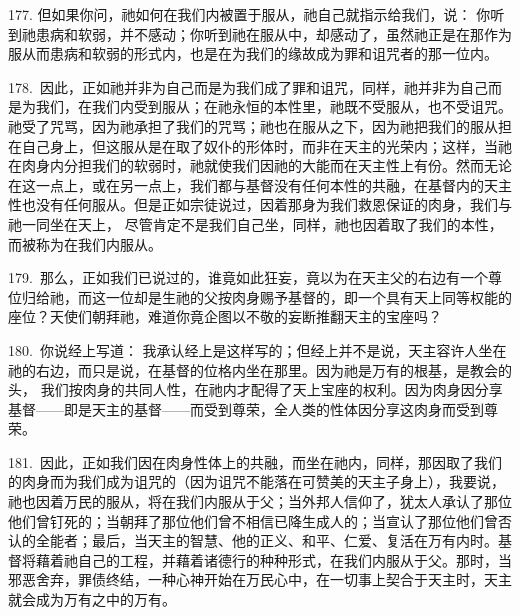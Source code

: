 177. 但如果你问，祂如何在我们内被置于服从，祂自己就指示给我们，说： 你听到祂患病和软弱，并不感动；你听到祂在服从中，却感动了，虽然祂正是在那作为服从而患病和软弱的形式内，也是在为我们的缘故成为罪和诅咒者的那一位内。\par

178.~因此，正如祂并非为自己而是为我们成了罪和诅咒，同样，祂并非为自己而是为我们，在我们内受到服从；在祂永恒的本性里，祂既不受服从，也不受诅咒。 祂受了咒骂，因为祂承担了我们的咒骂；祂也在服从之下，因为祂把我们的服从担在自己身上，但这服从是在取了奴仆的形体时，而非在天主的光荣内；这样，当祂在肉身内分担我们的软弱时，祂就使我们因祂的大能而在天主性上有份。然而无论在这一点上，或在另一点上，我们都与基督没有任何本性的共融，在基督内的天主性也没有任何服从。但是正如宗徒说过，因着那身为我们救恩保证的肉身，我们与祂一同坐在天上， 尽管肯定不是我们自己坐，同样，祂也因着取了我们的本性，而被称为在我们内服从。\par

179.~那么，正如我们已说过的，谁竟如此狂妄，竟以为在天主父的右边有一个尊位归给祂，而这一位却是生祂的父按肉身赐予基督的，即一个具有天上同等权能的座位？天使们朝拜祂，难道你竟企图以不敬的妄断推翻天主的宝座吗？\par

180.~你说经上写道： 我承认经上是这样写的；但经上并不是说，天主容许人坐在祂的右边，而只是说，在基督的位格内坐在那里。因为祂是万有的根基，是教会的头， 我们按肉身的共同人性，在祂内才配得了天上宝座的权利。因为肉身因分享基督——即是天主的基督——而受到尊荣，全人类的性体因分享这肉身而受到尊荣。\par

181.~因此，正如我们因在肉身性体上的共融，而坐在祂内，同样，那因取了我们的肉身而为我们成为诅咒的（因为诅咒不能落在可赞美的天主子身上），我要说，祂也因着万民的服从，将在我们内服从于父；当外邦人信仰了，犹太人承认了那位他们曾钉死的；当朝拜了那位他们曾不相信已降生成人的；当宣认了那位他们曾否认的全能者；最后，当天主的智慧、他的正义、和平、仁爱、复活在万有内时。基督将藉着祂自己的工程，并藉着诸德行的种种形式，在我们内服从于父。那时，当邪恶舍弃，罪债终结，一种心神开始在万民心中，在一切事上契合于天主时，天主就会成为万有之中的万有。\par

